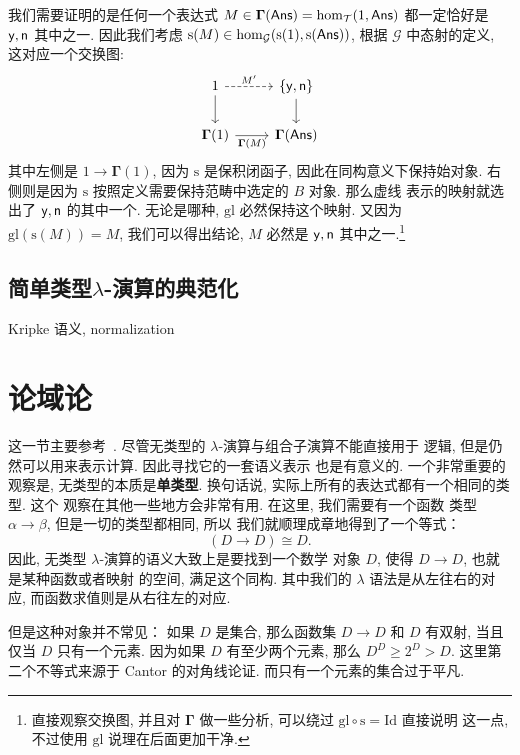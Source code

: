 我们需要证明的是任何一个表达式 \(M \in \boldsymbol\Gamma(\textnormal{\textsf{Ans}})
= \hom_{\mathcal T}(1, \textnormal{\textsf{Ans}})\) 都一定恰好是
\(\textnormal{\textsf{y}},\textnormal{\textsf{n}}\) 其中之一.
因此我们考虑 \(\mathrm{s}(M) \in \hom_{\mathcal G}(\mathrm{s}(1), \mathrm{s}(\textnormal{\textsf{Ans}}))\),
根据 \(\mathcal G\) 中态射的定义, 这对应一个交换图:
\[
\begin{tikzcd}
1 \ar[r, dashed, "M'"] \ar[d] & \{\cons{y}, \cons{n}\}\ar[d]\\
\boldsymbol\Gamma(1) \ar[r, "\boldsymbol\Gamma(M)"'] & \boldsymbol\Gamma(\cons{Ans})
\end{tikzcd}
\]
其中左侧是 \(1 \to \boldsymbol\Gamma(1)\),
因为 \(\mathrm{s}\) 是保积闭函子,
因此在同构意义下保持始对象. 右侧则是因为 \(\mathrm{s}\)
按照定义需要保持范畴中选定的 \(B\) 对象. 那么虚线
表示的映射就选出了 \(\textnormal{\textsf{y}}, \textnormal{\textsf{n}}\)
的其中一个. 无论是哪种, \(\mathrm{gl}\) 必然保持这个映射.
又因为 \(\mathrm{gl}(\mathrm{s}(M)) = M\),
我们可以得出结论, \(M\) 必然是 \(\textnormal{\textsf{y}}, \textnormal{\textsf{n}}\)
其中之一.\footnote{直接观察交换图, 并且对 \(\boldsymbol{\Gamma}\)
做一些分析, 可以绕过 \(\mathrm{gl}\circ\mathrm{s} = \mathrm{Id}\) 直接说明
这一点, 不过使用 \(\mathrm{gl}\) 说理在后面更加干净.}

\subsection{简单类型\texorpdfstring{\(\lambda\)}{Lambda}-演算的典范化}
Kripke 语义, normalization

\section{论域论}\label{beginning:domain}

这一节主要参考~\cites{abramsky:1995:domain}{cartwright:2016:domain}.
尽管无类型的 \(\lambda\)-演算与组合子演算不能直接用于
逻辑, 但是仍然可以用来表示计算. 因此寻找它的一套语义表示
也是有意义的. 一个非常重要的观察是, 无类型的本质是\textbf{单类型}.
换句话说, 实际上所有的表达式都有一个相同的类型. 这个
观察在其他一些地方会非常有用. 在这里, 我们需要有一个函数
类型 \(\alpha \to \beta\), 但是一切的类型都相同, 所以
我们就顺理成章地得到了一个等式：
\[(D \to D) \cong D.\]
因此, 无类型 \(\lambda\)-演算的语义大致上是要找到一个数学
对象 \(D\), 使得 \(D \to D\), 也就是某种函数或者映射
的空间, 满足这个同构. 其中我们的 \(\lambda\)
语法是从左往右的对应, 而函数求值则是从右往左的对应.

但是这种对象并不常见： 如果 \(D\) 是集合, 那么函数集
\(D \to D\)
和 \(D\) 有双射, 当且仅当 \(D\) 只有一个元素. 因为如果
\(D\) 有至少两个元素, 那么
\(D^D \ge 2^D > D\).
这里第二个不等式来源于 Cantor 的对角线论证.
而只有一个元素的集合过于平凡.

